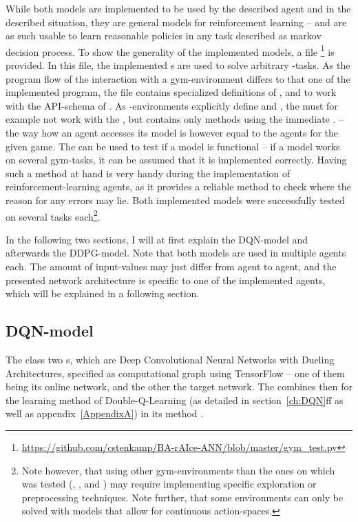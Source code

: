 While both models are implemented to be used by the described agent and in the described situation, they are general models for reinforcement learning -- and are as such usable to learn reasonable policies in any task described as markov decision process. To show the generality of the implemented models, a file \footnote{\url{https://github.com/cstenkamp/BA-rAIce-ANN/blob/master/gym\_test.py}} is provided. In this file, the implemented s are used to solve arbitrary -tasks. As the program flow of the interaction with a gym-environment differs to that one of the implemented program, the file contains specialized definitions of ,  and  to work with the API-schema of . As -environments explicitly define  and , the  must for example not work with the , but contains only methods using the immediate . -- the way how an agent accesses its model is however equal to the agents for the given game. The  can be used to test if a model is functional -- if a model works on several gym-tasks, it can be assumed that it is implemented correctly. Having such a method at hand is very handy during the implementation of reinforcement-learning agents, as it provides a reliable method to check where the reason for any errors may lie. Both implemented models were successfully tested on several tasks each\footnote{Note however, that using other gym-environments than the ones on which was tested (, ,  and ) may require implementing specific exploration or preprocessing techniques. Note further, that some environments can only be solved with models that allow for continuous action-spaces.}.


In the following two sections, I will at first explain the DQN-model and afterwards the DDPG-model. Note that both models are used in multiple agents each. The amount of input-values may just differ from agent to agent, and the presented network architecture is specific to one of the implemented agents, which will be explained in a following section.


\subsection{DQN-model}

The class   two s, which are Deep Convolutional Neural Networks with Dueling Architectures, specified as computational graph using TensorFlow -- one of them being its online network, and the other the target network. The  combines then for the learning method of Double-Q-Learning (as detailed in section~\ref{ch:DQN}ff as well as appendix~\ref{AppendixA}) in its method . 

